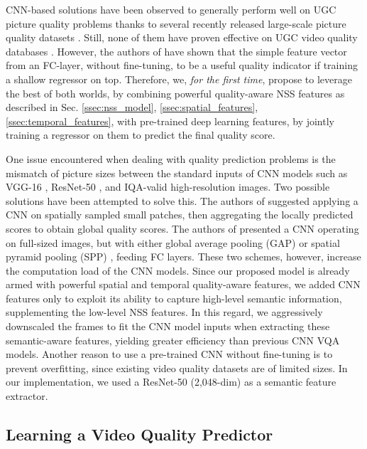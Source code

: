 \documentclass[transmag]{IEEEtran}
\begin{document}
CNN-based solutions have been observed to generally perform well on UGC picture quality problems \cite{hosu2020koniq, ying2019patches, zhang2018blind} thanks to several recently released large-scale picture quality datasets \cite{hosu2020koniq, ying2019patches, fang2020perceptual}. Still, none of them have proven effective on UGC video quality databases \cite{sinno2018large, hosu2017konstanz, wang2019youtube}. However, the authors of \cite{tu2020ugc} have shown that the simple feature vector from an FC-layer, without fine-tuning, to be a useful quality indicator if training a shallow regressor on top. Therefore, we, \textit{for the first time}, propose to leverage the best of both worlds, by combining powerful quality-aware NSS features as described in Sec. \ref{ssec:nss_model}, \ref{ssec:spatial_features}, \ref{ssec:temporal_features}, with pre-trained deep learning features, by jointly training a regressor on them to predict the final quality score.

One issue encountered when dealing with quality prediction problems is the mismatch of picture sizes between the standard inputs of CNN models such as VGG-16 \cite{simonyan2014very}, ResNet-50 \cite{he2016deep}, and IQA-valid high-resolution images. Two possible solutions have been attempted to solve this. The authors of \cite{kim2017deep, ying2019patches} suggested applying a CNN on spatially sampled small patches, then aggregating the locally predicted scores to obtain global quality scores. The authors of \cite{hosu2020koniq} presented a CNN operating on full-sized images, but with either global average pooling (GAP) or spatial pyramid pooling (SPP) \cite{he2015spatial}, feeding FC layers. These two schemes, however, increase the computation load of the CNN models. Since our proposed model is already armed with powerful spatial and temporal quality-aware features, we added CNN features only to exploit its ability to capture high-level semantic information, supplementing the low-level NSS features. In this regard, we aggressively downscaled the frames to fit the CNN model inputs when extracting these semantic-aware features, yielding greater efficiency than previous CNN VQA models. Another reason to use a pre-trained CNN without fine-tuning is to prevent overfitting, since existing video quality datasets are of limited sizes. In our implementation, we used a ResNet-50 (2,048-dim) as a semantic feature extractor.

\subsection{Learning a Video Quality Predictor}
\label{ssec:predictor}
\end{document}
